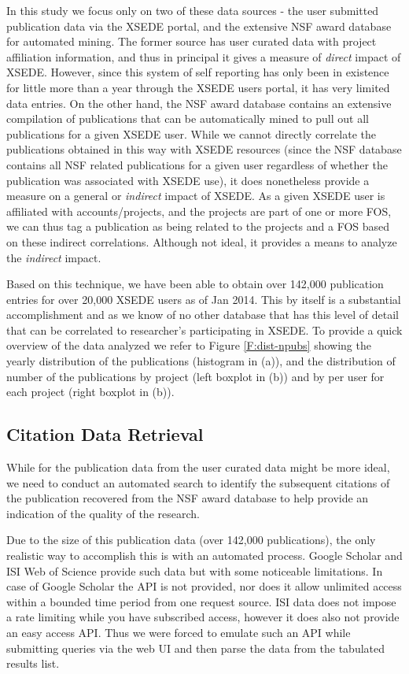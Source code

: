 \documentclass{sig-alternate}
\begin{document}
In this study we focus only on two of these data sources - the user submitted publication data via the XSEDE portal, and the extensive NSF award database for automated mining. The former source has user curated data with project affiliation information, and thus in principal it gives a measure of \emph{direct} impact of XSEDE. However, since this system of self reporting has only been in existence for little more than a year through the XSEDE users portal, it has very limited data entries.  On the other hand, the NSF award database contains an extensive compilation of publications that can be automatically mined to pull out all publications for a given XSEDE user.   While we cannot directly correlate the publications obtained in this way with XSEDE resources (since the NSF database contains all NSF related publications for a given user regardless of whether the publication was associated with XSEDE use), it does nonetheless provide a measure on a general or \emph{indirect} impact of XSEDE.   As a given XSEDE user is affiliated with accounts/projects, and the projects are part of one or more FOS, we can thus tag a publication as being related to the projects and a FOS based on these indirect correlations. Although not ideal, it provides a means to analyze the \emph{indirect} impact. 
 
Based on this technique, we have been able to obtain over 142,000 publication entries for over 20,000 XSEDE users as of Jan 2014.  This by itself is a substantial accomplishment and as we know of no other database that has this level of detail that can be correlated to researcher's participating in XSEDE. To provide a quick overview of the data analyzed we refer to Figure \ref{F:dist-npubs} showing the yearly distribution of the publications (histogram in (a)), and the distribution of number of the publications by project (left boxplot in (b)) and by per user for each project (right boxplot in (b)). 
 
\subsection{Citation Data Retrieval} 
 
While for the publication data from the user curated data might be more ideal, we need to conduct an automated search to identify the subsequent citations of the publication recovered from the NSF award database to help provide an indication of the quality of the research. 

Due to the size of this publication data (over 142,000 publications), the only realistic way to accomplish this is with an automated process. Google Scholar and ISI Web of Science provide such data but with some noticeable limitations. In case of Google Scholar the API is not provided, nor does it allow unlimited access within a bounded time period from one request source. ISI data does not impose a rate limiting while you have subscribed access, however it does also not provide an easy access API. Thus we were forced to emulate such an API while submitting queries via the web UI and then parse the data from the tabulated results list. 
 
\end{document}

